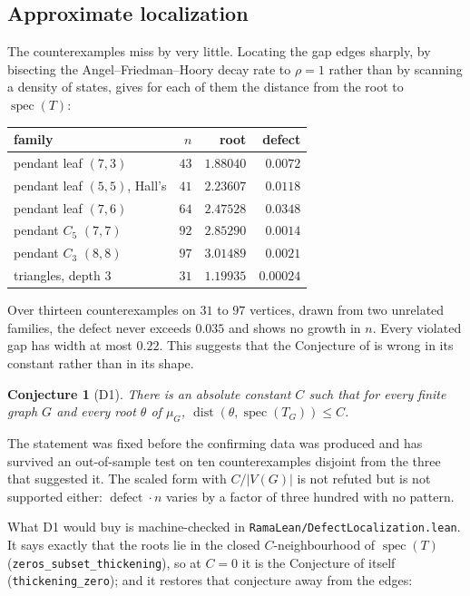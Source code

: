 \documentclass[11pt]{article}
\newtheorem{conjecture}[theorem]{Conjecture}
\theoremstyle{remark}
\begin{document}
\subsection{Approximate localization}\label{sec:defect}

The counterexamples miss by very little. Locating the gap edges sharply, by bisecting the
Angel--Friedman--Hoory decay rate to $\rho=1$ rather than by scanning a density of states,
gives for each of them the distance from the root to $\operatorname{spec}(T)$:

\begin{center}
\begin{tabular}{lrrr}
family & $n$ & root & defect\\\hline
pendant leaf $(7,3)$ & $43$ & $1.88040$ & $0.0072$\\
pendant leaf $(5,5)$, Hall's & $41$ & $2.23607$ & $0.0118$\\
pendant leaf $(7,6)$ & $64$ & $2.47528$ & $0.0348$\\
pendant $C_5$ $(7,7)$ & $92$ & $2.85290$ & $0.0014$\\
pendant $C_3$ $(8,8)$ & $97$ & $3.01489$ & $0.0021$\\
triangles, depth $3$ & $31$ & $1.19935$ & $0.00024$\\
\end{tabular}
\end{center}

Over thirteen counterexamples on $31$ to $97$ vertices, drawn from two unrelated families, the
defect never exceeds $0.035$ and shows no growth in $n$. Every violated gap has width at most
$0.22$. This suggests that the Conjecture of \cite{PartI} is wrong in its constant rather than in
its shape.

\begin{conjecture}[D1]\label{conj:defect}
There is an absolute constant $C$ such that for every finite graph $G$ and every root $\theta$
of $\mu_G$, $\operatorname{dist}(\theta,\operatorname{spec}(T_G))\le C$.
\end{conjecture}

The statement was fixed before the confirming data was produced and has survived an
out-of-sample test on ten counterexamples disjoint from the three that suggested it. The
scaled form with $C/|V(G)|$ is not refuted but is not supported either: $\operatorname{defect}
\cdot n$ varies by a factor of three hundred with no pattern.

What D1 would buy is machine-checked in \texttt{RamaLean/DefectLocalization.lean}. It says
exactly that the roots lie in the closed $C$-neighbourhood of $\operatorname{spec}(T)$
(\texttt{zeros\_subset\_thickening}), so at $C=0$ it is the Conjecture of \cite{PartI} itself
(\texttt{thickening\_zero}); and it restores that conjecture away from the edges:
\end{document}
